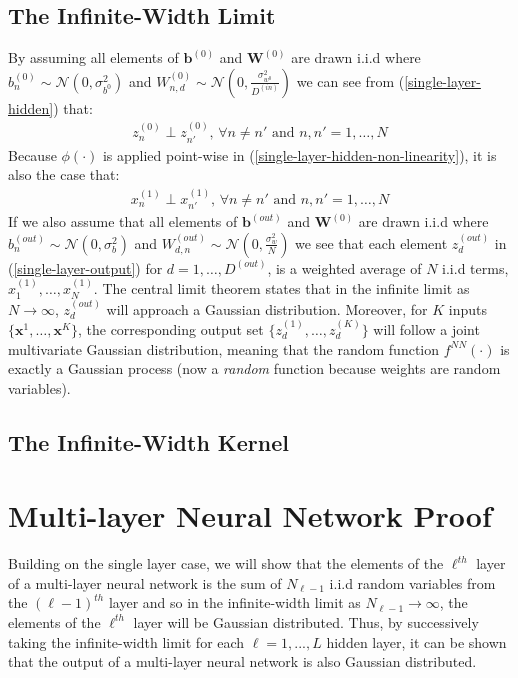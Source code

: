 \documentclass[twoside,11pt]{article}
\begin{document}
\subsection{The Infinite-Width Limit}
By assuming all elements of $\mathbf{b}^{(0)}$ and $\mathbf{W}^{(0)}$ are drawn i.i.d where $b^{(0)}_n \sim \mathcal{N}(0, \sigma_{b^{0}}^2)$ and $W^{(0)}_{n, d} \sim \mathcal{N}(0, \frac{\sigma_{w^{0}}^2}{D^{(in)}})$ we can see from (\ref{single-layer-hidden}) that:
\begin{align}
    z_{n}^{(0)} \perp z_{n'}^{(0)} \text{, } \forall n \neq n' \text{ and } n, n' = 1, \dots, N
\end{align}
Because $\phi(\cdot)$ is applied point-wise in (\ref{single-layer-hidden-non-linearity}), it is also the case that:
\begin{align}
    x_{n}^{(1)} \perp x_{n'}^{(1)} \text{, } \forall n \neq n' \text{ and } n, n' = 1, \dots, N
\end{align}
If we also assume that all elements of $\mathbf{b}^{(out)}$ and $\mathbf{W}^{(0)}$ are drawn i.i.d where $b^{(out)}_n \sim \mathcal{N}(0, \sigma_b^2)$ and $W^{(out)}_{d, n} \sim \mathcal{N}(0, \frac{\sigma_{w}^2}{N})$ we see that each element $z_d^{(out)}$ in (\ref{single-layer-output}) for $d=1, \dots, D^{(out)}$, is a weighted average of $N$ i.i.d terms, $x_1^{(1)}, \dots, x_N^{(1)}$. The central limit theorem states that in the infinite limit as $N \rightarrow \infty$, $z_d^{(out)}$ will approach a Gaussian distribution. Moreover, for $K$ inputs $\{\textbf{x}^1, \dots, \textbf{x}^K\}$, the corresponding output set $\{z_d^{(1)}, \dots, z_d^{(K)}\}$ will follow a joint multivariate Gaussian distribution, meaning that the random function $f^{NN}(\cdot)$ is exactly a Gaussian process (now a \textit{random} function because weights are random variables).
\subsection{The Infinite-Width Kernel}
\section{Multi-layer Neural Network Proof \cite{lee2018deep}}
Building on the single layer case, we will show that the elements of the $\ell^{th}$ layer of a multi-layer neural network is the sum of $N_{\ell-1}$ i.i.d random variables from the  $(\ell-1)^{th}$ layer and so in the infinite-width limit as $N_{\ell-1} \rightarrow \infty$, the elements of the $\ell^{th}$ layer will be Gaussian distributed. Thus, by successively taking the infinite-width limit for each $\ell=1,...,L$ hidden layer, it can be shown that the output of a multi-layer neural network is also Gaussian distributed.
\end{document}
